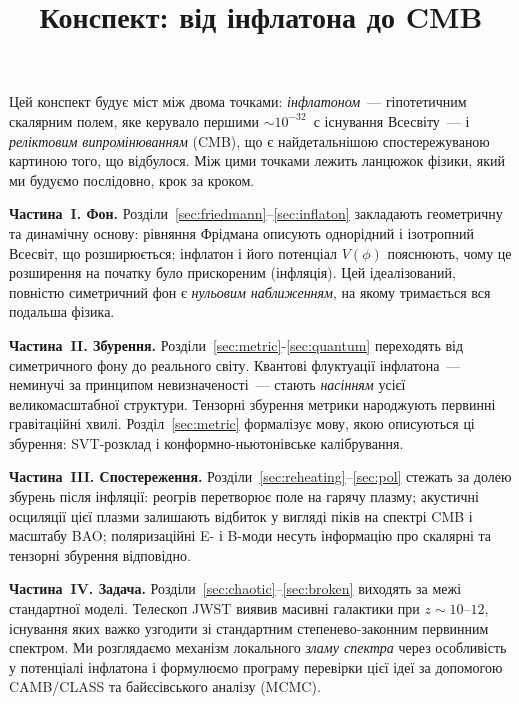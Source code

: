 \documentclass[12pt, a4paper]{article}
\title{\bfseries Конспект: від інфлатона до CMB}
\author{}
\date{}
\begin{document}
\maketitle
\tableofcontents
\newpage


Цей конспект будує міст між двома точками: \emph{інфлатоном}~---
гіпотетичним скалярним полем, яке керувало першими
${\sim}10^{-32}$~с існування Всесвіту~--- і \emph{реліктовим випромінюванням} (CMB),
що є найдетальнішою спостережуваною картиною того, що відбулося.
Між цими точками лежить ланцюжок фізики, який ми будуємо
послідовно, крок за кроком.

\textbf{Частина~I. Фон.} Розділи~\ref{sec:friedmann}–\ref{sec:inflaton}
закладають геометричну та динамічну основу: рівняння Фрідмана описують
однорідний і ізотропний Всесвіт, що розширюється; інфлатон і його
потенціал $V(\phi)$ пояснюють, чому це розширення на початку було
прискореним (інфляція). Цей ідеалізований, повністю симетричний фон є
\emph{нульовим наближенням}, на якому тримається вся подальша фізика.

\textbf{Частина~II. Збурення.} Розділи~\ref{sec:metric}-\ref{sec:quantum}
переходять від симетричного фону до реального світу. Квантові флуктуації
інфлатона~--- неминучі за принципом невизначеності~--- стають
\emph{насінням} усієї великомасштабної структури. Тензорні збурення
метрики народжують первинні гравітаційні хвилі. Розділ~\ref{sec:metric}
формалізує мову, якою описуються ці збурення: SVT-розклад і
конформно-ньютонівське калібрування.

\textbf{Частина~III. Спостереження.} Розділи~\ref{sec:reheating}–\ref{sec:pol}
стежать за долею збурень після інфляції: реогрів перетворює поле на
гарячу плазму; акустичні осциляції цієї плазми залишають відбиток у
вигляді піків на спектрі CMB і масштабу BAO; поляризаційні E- і B-моди
несуть інформацію про скалярні та тензорні збурення відповідно.

\textbf{Частина~IV. Задача.} Розділи~\ref{sec:chaotic}–\ref{sec:broken}
виходять за межі стандартної моделі. Телескоп JWST виявив масивні
галактики при $z \sim 10$–$12$, існування яких важко узгодити зі
стандартним степенево-законним первинним спектром. Ми розглядаємо
механізм локального \emph{зламу спектра} через особливість у потенціалі
інфлатона і формулюємо програму перевірки цієї ідеї за допомогою
CAMB/CLASS та байєсівського аналізу (MCMC).
\end{document}

